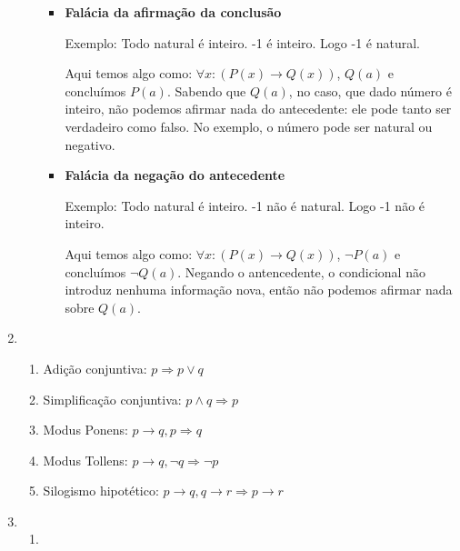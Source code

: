 \documentclass[leqno]{article} %
\begin{document}
\begin{enumerate}
\begin{enumerate}
                \begin{itemize}

                    \item \textbf{Falácia da afirmação da conclusão} 

                        \noindent Exemplo: Todo natural é inteiro. -1 é inteiro. Logo -1 é natural.

                        Aqui temos algo como: \( \forall x : (P(x) \to Q(x)) \), \( Q(a) \) e concluímos \( P(a) \). Sabendo que \( Q(a) \), no caso, que dado número é inteiro, não podemos afirmar nada do antecedente: ele pode tanto ser verdadeiro como falso. No exemplo, o número pode ser natural ou negativo.

                    \item \textbf{Falácia da negação do antecedente} 

                        \noindent Exemplo: Todo natural é inteiro. -1 não é natural. Logo -1 não é inteiro.

                        Aqui temos algo como: \( \forall x : (P(x) \to Q(x)) \), \( \neg P(a) \) e concluímos \( \neg Q(a) \). Negando o antencedente, o condicional não introduz nenhuma informação nova, então não podemos afirmar nada sobre \( Q(a) \). 

                \end{itemize}

        \end{enumerate}

    \item 
        \begin{enumerate}
            \item Adição conjuntiva: \( p \Rightarrow p \lor q \)
            \item Simplificação conjuntiva: \( p \land q \Rightarrow  p \)
            \item Modus Ponens: \( p \to q, p \Rightarrow q \)
            \item Modus Tollens: \( p \to q, \neg q \Rightarrow \neg p \)
            \item Silogismo hipotético: \( p \to q, q \to r \Rightarrow p \to r\)
        \end{enumerate}

    \item

        \begin{enumerate}

            \item 


\end{enumerate}
\end{enumerate}
\end{document}

